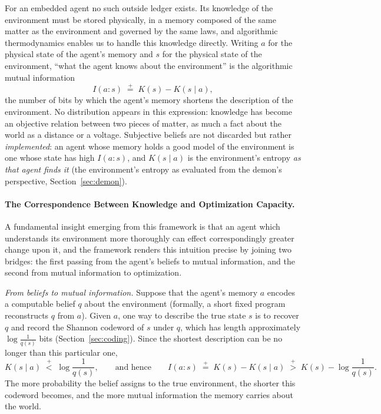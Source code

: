 \documentclass[11pt]{article}
\newcommand{\plt}{\mathrel{\stackrel{+}{<}}}
\newcommand{\pgt}{\mathrel{\stackrel{+}{>}}}
\newcommand{\peq}{\mathrel{\stackrel{+}{=}}}
\begin{document}
For an embedded agent no such outside ledger exists. Its knowledge of the environment must be stored physically, in a memory composed of the same matter as the environment and governed by the same laws, and algorithmic thermodynamics enables us to handle this knowledge directly. Writing $a$ for the physical state of the agent's memory and $s$ for the physical state of the environment, ``what the agent knows about the environment'' is the algorithmic mutual information
\[
I(a : s) \;\peq\; K(s) - K(s \mid a),
\]
the number of bits by which the agent's memory shortens the description of the environment. No distribution appears in this expression: knowledge has become an objective relation between two pieces of matter, as much a fact about the world as a distance or a voltage. Subjective beliefs are not discarded but rather \emph{implemented}: an agent whose memory holds a good model of the environment is one whose state has high $I(a:s)$, and $K(s \mid a)$ is the environment's entropy \emph{as that agent finds it} (the environment's entropy as evaluated from the demon's perspective, Section~\ref{sec:demon}).

\paragraph{The Correspondence Between Knowledge and Optimization Capacity.} A fundamental insight emerging from this framework is that an agent which understands its environment more thoroughly can effect correspondingly greater change upon it, and the framework renders this intuition precise by joining two bridges: the first passing from the agent's beliefs to mutual information, and the second from mutual information to optimization.

\emph{From beliefs to mutual information.} Suppose that the agent's memory $a$ encodes a computable belief $q$ about the environment (formally, a short fixed program reconstructs $q$ from $a$). Given $a$, one way to describe the true state $s$ is to recover $q$ and record the Shannon codeword of $s$ under $q$, which has length approximately $\log \tfrac{1}{q(s)}$ bits (Section~\ref{sec:coding}). Since the shortest description can be no longer than this particular one,
\[
K(s \mid a) \;\plt\; \log \frac{1}{q(s)},
\qquad\text{and hence}\qquad
I(a : s) \;\peq\; K(s) - K(s \mid a) \;\pgt\; K(s) - \log \frac{1}{q(s)}.
\]
The more probability the belief assigns to the true environment, the shorter this codeword becomes, and the more mutual information the memory carries about the world.
\end{document}

